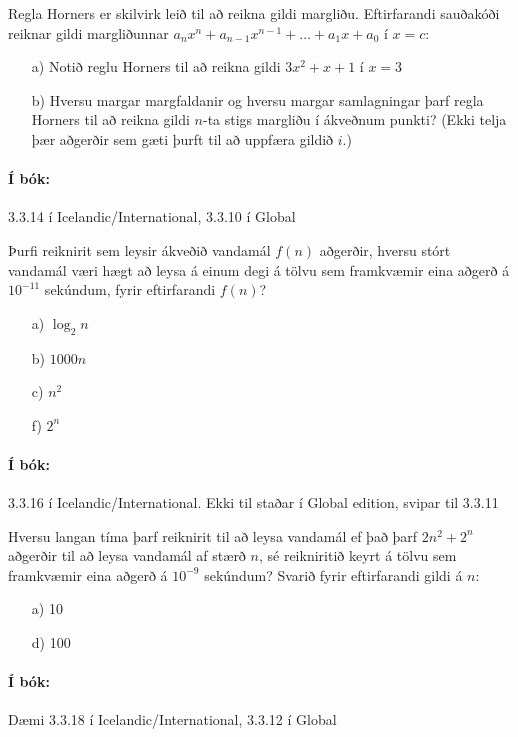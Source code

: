 \documentclass{article}
\begin{document}
\question

Regla Horners er skilvirk leið til að reikna gildi margliðu. Eftirfarandi sauðakóði reiknar gildi margliðunnar $a_nx^n + a_{n-1}x^{n-1}+\ldots+a_1x+a_0$ í $x = c$:

\begin{itemize}
    \item[a)] Notið reglu Horners til að reikna gildi $3x^2+x+1$ í $x=3$
    \item[b)] Hversu margar margfaldanir og hversu margar samlagningar þarf regla Horners til að reikna gildi $n$-ta stigs margliðu í ákveðnum punkti? (Ekki telja þær aðgerðir sem gæti þurft til að uppfæra gildið $i$.)
\end{itemize}

\paragraph{Í bók:} 3.3.14 í Icelandic/International, 3.3.10 í Global

\question

Þurfi reiknirit sem leysir ákveðið vandamál $f(n)$ aðgerðir, hversu stórt vandamál væri hægt að leysa á einum degi á tölvu sem framkvæmir eina aðgerð á $10^{-11}$ sekúndum, fyrir eftirfarandi $f(n)$?

\begin{itemize}
    \item[a)] $\log_2 n$
    \item[b)] $1000n$
    \item[c)] $n^2$
    \item[f)] $2^n$
\end{itemize}

\paragraph{Í bók:} 3.3.16 í Icelandic/International. Ekki til staðar í Global edition, svipar til 3.3.11

\question

Hversu langan tíma þarf reiknirit til að leysa vandamál ef það þarf $2n^2+2^n$ aðgerðir til að leysa vandamál af stærð $n$, sé reikniritið keyrt á tölvu sem framkvæmir eina aðgerð á $10^{-9}$ sekúndum? Svarið fyrir eftirfarandi gildi á $n$:

\begin{itemize}
    \item[a)] 10
    \item[d)] 100
\end{itemize}

\paragraph{Í bók:} Dæmi 3.3.18 í Icelandic/International, 3.3.12 í Global
\end{document}
